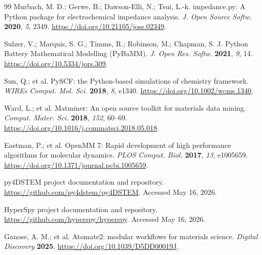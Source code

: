 \documentclass[11pt]{article}
\begin{document}
\begin{thebibliography}{99}
Murbach, M. D.; Gerwe, B.; Dawson-Elli, N.; Tsui, L.-k. impedance.py: A Python package for electrochemical impedance analysis. \emph{J. Open Source Softw.} \textbf{2020}, \emph{5}, 2349. \url{https://doi.org/10.21105/joss.02349}.

Sulzer, V.; Marquis, S. G.; Timms, R.; Robinson, M.; Chapman, S. J. Python Battery Mathematical Modelling (PyBaMM). \emph{J. Open Res. Softw.} \textbf{2021}, \emph{9}, 14. \url{https://doi.org/10.5334/jors.309}.

Sun, Q.; et al. PySCF: the Python-based simulations of chemistry framework. \emph{WIREs Comput. Mol. Sci.} \textbf{2018}, \emph{8}, e1340. \url{https://doi.org/10.1002/wcms.1340}.

Ward, L.; et al. Matminer: An open source toolkit for materials data mining. \emph{Comput. Mater. Sci.} \textbf{2018}, \emph{152}, 60--69. \url{https://doi.org/10.1016/j.commatsci.2018.05.018}.

Eastman, P.; et al. OpenMM 7: Rapid development of high performance algorithms for molecular dynamics. \emph{PLOS Comput. Biol.} \textbf{2017}, \emph{13}, e1005659. \url{https://doi.org/10.1371/journal.pcbi.1005659}.

py4DSTEM project documentation and repository. \url{https://github.com/py4dstem/py4DSTEM}. Accessed May 16, 2026.

HyperSpy project documentation and repository. \url{https://github.com/hyperspy/hyperspy}. Accessed May 16, 2026.

Ganose, A. M.; et al. Atomate2: modular workflows for materials science. \emph{Digital Discovery} \textbf{2025}. \url{https://doi.org/10.1039/D5DD00019J}.

\end{thebibliography}
\end{document}

